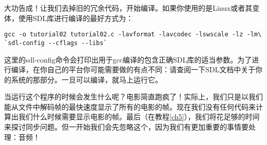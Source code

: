 大功告成！让我们去掉旧的冗余代码，开始编译。如果你使用的是Linux或者其变体，使用SDL库进行编译的最好方式为：
\begin{lstlisting}
gcc -o tutorial02 tutorial02.c -lavformat -lavcodec -lswscale -lz -lm\
`sdl-config --cflags --libs`
\end{lstlisting}


这里的sdl-config命令会打印出用于gcc编译的包含正确SDL库的适当参数。为了进行编译，在你自己的平台你可能需要做的有点不同：请查阅一下SDL文档中关于你的系统的那部分。一旦可以编译，就马上运行它。

当运行这个程序的时候会发生什么呢？电影简直跑疯了！实际上，我们只是以我们能从文件中解码帧的最快速度显示了所有的电影的帧。现在我们没有任何代码来计算出我们什么时候需要显示电影的帧。最后（在教程\ref{ch5}），我们将花足够的时间来探讨同步问题。但一开始我们会先忽略这个，因为我们有更加重要的事情要处理：音频！
